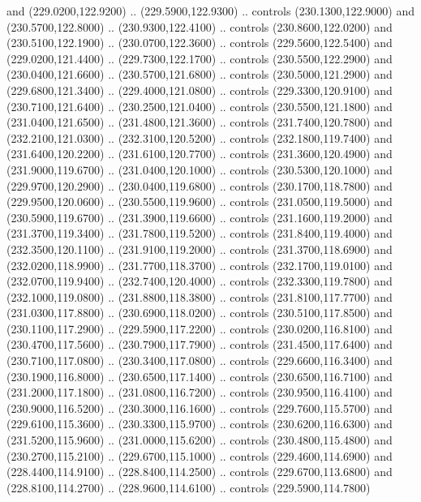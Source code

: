 {\begin{scope}[y=0.80pt, x=0.80pt, yscale=-1, xscale=1, inner sep=0pt, outer sep=0pt, #1]
      and (229.0200,122.9200) .. (229.5900,122.9300) .. controls (230.1300,122.9000)
      and (230.5700,122.8000) .. (230.9300,122.4100) .. controls (230.8600,122.0200)
      and (230.5100,122.1900) .. (230.0700,122.3600) .. controls (229.5600,122.5400)
      and (229.0200,121.4400) .. (229.7300,122.1700) .. controls (230.5500,122.2900)
      and (230.0400,121.6600) .. (230.5700,121.6800) .. controls (230.5000,121.2900)
      and (229.6800,121.3400) .. (229.4000,121.0800) .. controls (229.3300,120.9100)
      and (230.7100,121.6400) .. (230.2500,121.0400) .. controls (230.5500,121.1800)
      and (231.0400,121.6500) .. (231.4800,121.3600) .. controls (231.7400,120.7800)
      and (232.2100,121.0300) .. (232.3100,120.5200) .. controls (232.1800,119.7400)
      and (231.6400,120.2200) .. (231.6100,120.7700) .. controls (231.3600,120.4900)
      and (231.9000,119.6700) .. (231.0400,120.1000) .. controls (230.5300,120.1000)
      and (229.9700,120.2900) .. (230.0400,119.6800) .. controls (230.1700,118.7800)
      and (229.9500,120.0600) .. (230.5500,119.9600) .. controls (231.0500,119.5000)
      and (230.5900,119.6700) .. (231.3900,119.6600) .. controls (231.1600,119.2000)
      and (231.3700,119.3400) .. (231.7800,119.5200) .. controls (231.8400,119.4000)
      and (232.3500,120.1100) .. (231.9100,119.2000) .. controls (231.3700,118.6900)
      and (232.0200,118.9900) .. (231.7700,118.3700) .. controls (232.1700,119.0100)
      and (232.0700,119.9400) .. (232.7400,120.4000) .. controls (232.3300,119.7800)
      and (232.1000,119.0800) .. (231.8800,118.3800) .. controls (231.8100,117.7700)
      and (231.0300,117.8800) .. (230.6900,118.0200) .. controls (230.5100,117.8500)
      and (230.1100,117.2900) .. (229.5900,117.2200) .. controls (230.0200,116.8100)
      and (230.4700,117.5600) .. (230.7900,117.7900) .. controls (231.4500,117.6400)
      and (230.7100,117.0800) .. (230.3400,117.0800) .. controls (229.6600,116.3400)
      and (230.1900,116.8000) .. (230.6500,117.1400) .. controls (230.6500,116.7100)
      and (231.2000,117.1800) .. (231.0800,116.7200) .. controls (230.9500,116.4100)
      and (230.9000,116.5200) .. (230.3000,116.1600) .. controls (229.7600,115.5700)
      and (229.6100,115.3600) .. (230.3300,115.9700) .. controls (230.6200,116.6300)
      and (231.5200,115.9600) .. (231.0000,115.6200) .. controls (230.4800,115.4800)
      and (230.2700,115.2100) .. (229.6700,115.1000) .. controls (229.4600,114.6900)
      and (228.4400,114.9100) .. (228.8400,114.2500) .. controls (229.6700,113.6800)
      and (228.8100,114.2700) .. (228.9600,114.6100) .. controls (229.5900,114.7800)

\end{scope}}
